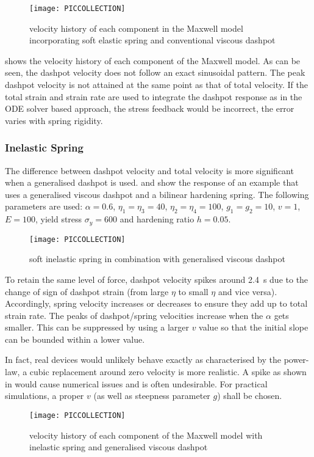 \begin{figure}[htb]
\centering\scriptsize
\texttt{[image: PICCOLLECTION]}
\caption{velocity history of each component in the Maxwell model incorporating soft elastic spring and conventional viscous dashpot}\label{fig:maxwell_sepv}
\end{figure}
 shows the velocity history of each component of the Maxwell model. As can be seen, the dashpot velocity does not follow an exact sinusoidal pattern. The peak dashpot velocity is not attained at the same point as that of total velocity. If the total strain and strain rate are used to integrate the dashpot response as in the ODE solver based approach, the stress feedback would be incorrect, the error varies with spring rigidity.
\subsubsection{Inelastic Spring}
The difference between dashpot velocity and total velocity is more significant when a generalised dashpot is used.  and  show the response of an example that uses a generalised viscous dashpot and a bilinear hardening spring. The following parameters are used: $\alpha=0.6$, $\eta_1=\eta_3=40$, $\eta_2=\eta_4=100$, $g_1=g_2=10$, $v=1$, $E=100$, yield stress $\sigma_y=600$ and hardening ratio $h=0.05$.
\begin{figure}[htb]
\centering\scriptsize
\texttt{[image: PICCOLLECTION]}
\caption{soft inelastic spring in combination with generalised viscous dashpot}\label{fig:maxwell_sep2}
\end{figure}
To retain the same level of force, dashpot velocity spikes around \SI{2.4}{\second} due to the change of sign of dashpot strain (from large $\eta$ to small $\eta$ and vice versa). Accordingly, spring velocity increases or decreases to ensure they add up to total strain rate. The peaks of dashpot/spring velocities increase when the $\alpha$ gets smaller. This can be suppressed by using a larger $v$ value so that the initial slope can be bounded within a lower value.

In fact, real devices would unlikely behave exactly as characterised by the power-law, a cubic replacement around zero velocity is more realistic. A spike as shown in  would cause numerical issues and is often undesirable. For practical simulations, a proper $v$ (as well as steepness parameter $g$) shall be chosen.
\begin{figure}[htb]
\centering\scriptsize
\texttt{[image: PICCOLLECTION]}
\caption{velocity history of each component of the Maxwell model with inelastic spring and generalised viscous dashpot}\label{fig:maxwell_sepv2}
\end{figure}
